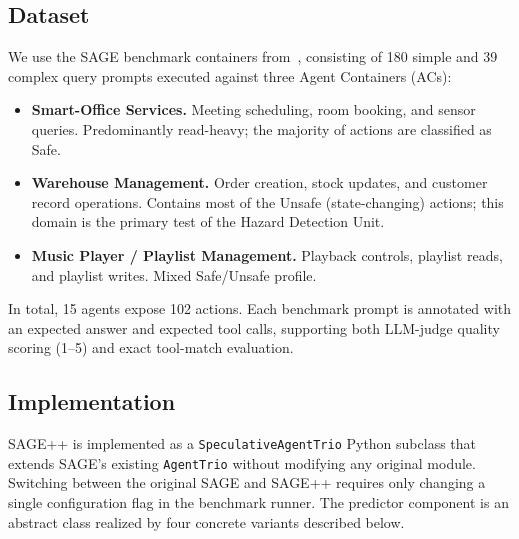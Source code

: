 \documentclass[conference]{IEEEtran}
\begin{document}
\subsection{Dataset}
We use the SAGE benchmark containers from~\cite{strehlow2026sage}, consisting
of 180 simple and 39 complex query prompts executed against three Agent
Containers (ACs):
\begin{itemize}[itemsep=3pt]
  \item \textbf{Smart-Office Services.} Meeting scheduling, room booking, and
        sensor queries. Predominantly read-heavy; the majority of actions are
        classified as Safe.
  \item \textbf{Warehouse Management.} Order creation, stock updates, and
        customer record operations.
        Contains most of the Unsafe (state-changing) actions; this domain is
        the primary test of the Hazard Detection Unit.
  \item \textbf{Music Player / Playlist Management.} Playback controls, playlist
        reads, and playlist writes. Mixed Safe/Unsafe profile.
\end{itemize}
In total, 15 agents expose 102 actions.
Each benchmark prompt is annotated with an expected answer and expected tool
calls, supporting both LLM-judge quality scoring (1--5) and exact tool-match
evaluation.

\subsection{Implementation}
SAGE++ is implemented as a \texttt{SpeculativeAgentTrio} Python subclass that
extends SAGE's existing \texttt{AgentTrio} without modifying any original module.
Switching between the original SAGE and SAGE++ requires only changing a single
configuration flag in the benchmark runner.
The predictor component is an abstract class realized by four concrete variants
described below.
\end{document}
